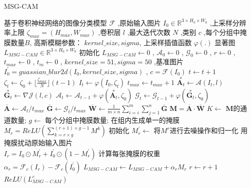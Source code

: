  \begin{algorithm}
	\caption{MSG-CAM}
	\label{alg:1}
	\renewcommand{\algorithmicrequire}{\textbf{输入:}}
	\renewcommand{\algorithmicensure}{\textbf{输出:}}
	\begin{algorithmic}[1]
		\REQUIRE 基于卷积神经网络的图像分类模型 $\mathcal{F} $ ,原始输入图片 $I_0 \in \mathbb{R}^{3\times H_0 \times W_0}$ ,上采样分辨率上限 $\zeta_{max}=(H_{max},W_{max})$ ,卷积层 $l$ ,最大迭代次数 $N$ ,类别 $c$ ,每个分组中掩膜数量$B$, 高斯模糊参数： $kernel\_size,sigma$, 上采样插值函数 $\varphi(.)$
		\ENSURE 显著图 $L_{MSG-CAM}\in \mathbb{R}^{3\times H_0 \times W_0}$
		\STATE 初始化 $L_{MSG-CAM} \leftarrow 0$ , $\mathcal{A}_0 \leftarrow 0$ , $\mathcal{G}_0 \leftarrow 0$ , $r \leftarrow 0$ , $t_{max}\leftarrow 0$ , $t_m\leftarrow 0$ , $kernel\_size=51,sigma=50$ ,基准图片 $I^{\prime}_0=guassian\_blur2d(I_0,kernel\_size,sigma)$ , $c=\mathcal{F}(I_0)$
		\STATE $t\leftarrow t+1$
		\STATE $\zeta_t\leftarrow \zeta_0 +\lfloor\frac{\zeta_{max}}{N}\rfloor(t-1)$
		\STATE $I_t\leftarrow \varphi(I_0,\zeta_t)$
		\STATE $t_{max}\leftarrow t_{max}+1$
		\STATE $\overset{*}{\boldsymbol{A}_t}\leftarrow \mathcal{A}(I_t,l)$
		\STATE $\overset{*}{\boldsymbol{G}_t}\leftarrow \nabla\mathcal{J}(l,c)$
		\STATE $\mathcal{A}_t \leftarrow \mathcal{A}_{t-1}+\varphi(\overset{*}{\boldsymbol{A}_t},\zeta_0)$
		\STATE $\mathcal{G}_t \leftarrow \mathcal{G}_{t-1}+\varphi(\overset{*}{\boldsymbol{G}_t},\zeta_0)$
		\ENDIF
		\ENDWHILE
		\STATE $\overline{\bm{A}}\leftarrow \mathcal{A}_t/t_{max}$
		\STATE $\overline{\bm{G}}\leftarrow \mathcal{G}_t/t_{max}$
		\STATE $\overline{\bm{W}}\leftarrow \frac{1}{m\times n}\sum_{i=i}^{m}\sum_{j=1}^{n}\overline{\bm{G}}$
		\STATE $\boldsymbol{M}=\overline{\bm{A}}\cdot\overline{\bm{W}}$
		\STATE $K\leftarrow$ $\boldsymbol{M}$的通道数量;
		\STATE $g\leftarrow$ 每个分组中掩膜数量;
		\STATE 在组内生成单一的掩膜\\ $M_r=ReLU(\sum_{k=r\times g}^{(r+1)\times g-1}M^k)$
		\STATE 初始化 $M^{\prime}_r\leftarrow$ 将$M^r$进行去噪操作和归一化
		\STATE 用掩膜扰动原始输入图片\\$I_r=I_0\odot M^{\prime}_r+I^{\prime}_0\odot (1-M^{\prime}_r)$
		\STATE 计算每张掩膜的权重\\$\alpha_r=\mathcal{F}_c(I_r)-\mathcal{F}_c(I^{\prime}_0)$
		\STATE $L_{MSG-CAM}\leftarrow L_{MSG-CAM}+\alpha_r M_r$
		\STATE $r\leftarrow r+1$
		\ENDWHILE
		\RETURN $ReLU(L^c_{MSG-CAM})$
	\end{algorithmic}
\end{algorithm}
